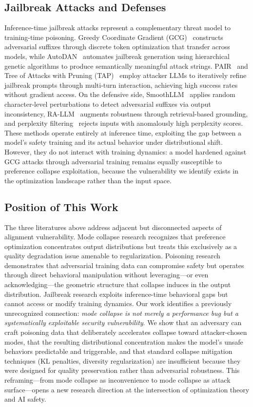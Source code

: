 \subsection{Jailbreak Attacks and Defenses}

Inference-time jailbreak attacks represent a complementary threat model to training-time poisoning. Greedy Coordinate Gradient (GCG)~\cite{zou2023gcg} constructs adversarial suffixes through discrete token optimization that transfer across models, while AutoDAN~\cite{liu2024autodan} automates jailbreak generation using hierarchical genetic algorithms to produce semantically meaningful attack strings. PAIR~\cite{chao2024pair} and Tree of Attacks with Pruning (TAP)~\cite{mehrotra2024tap} employ attacker LLMs to iteratively refine jailbreak prompts through multi-turn interaction, achieving high success rates without gradient access. On the defensive side, SmoothLLM~\cite{robey2024smoothllm} applies random character-level perturbations to detect adversarial suffixes via output inconsistency, RA-LLM~\cite{cao2024rallm} augments robustness through retrieval-based grounding, and perplexity filtering~\cite{jain2023perplexity} rejects inputs with anomalously high perplexity scores. These methods operate entirely at inference time, exploiting the gap between a model's safety training and its actual behavior under distributional shift. However, they do not interact with training dynamics: a model hardened against GCG attacks through adversarial training remains equally susceptible to preference collapse exploitation, because the vulnerability we identify exists in the optimization landscape rather than the input space.

\subsection{Position of This Work}

The three literatures above address adjacent but disconnected aspects of alignment vulnerability. Mode collapse research recognizes that preference optimization concentrates output distributions but treats this exclusively as a quality degradation issue amenable to regularization. Poisoning research demonstrates that adversarial training data can compromise safety but operates through direct behavioral manipulation without leveraging---or even acknowledging---the geometric structure that collapse induces in the output distribution. Jailbreak research exploits inference-time behavioral gaps but cannot access or modify training dynamics. Our work identifies a previously unrecognized connection: \emph{mode collapse is not merely a performance bug but a systematically exploitable security vulnerability}. We show that an adversary can craft poisoning data that deliberately accelerates collapse toward attacker-chosen modes, that the resulting distributional concentration makes the model's unsafe behaviors predictable and triggerable, and that standard collapse mitigation techniques (KL penalties, diversity regularization) are insufficient because they were designed for quality preservation rather than adversarial robustness. This reframing---from mode collapse as inconvenience to mode collapse as attack surface---opens a new research direction at the intersection of optimization theory and AI safety.
